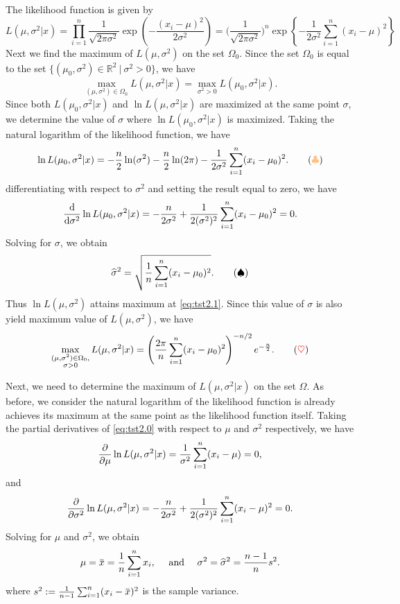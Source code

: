 \begin{solution}
    The likelihood function is given by
    \[
    L(\mu, \sigma^2 | x) = \prod_{i=1}^{n} \frac{1}{\sqrt{2\pi \sigma^2}} \exp\left(-\frac{(x_i - \mu)^2}{2\sigma^2}\right)
    = \bigg(\frac{1}{\sqrt{2\pi \sigma^2}}\bigg)^n \exp\left\{-\frac{1}{2\sigma^2} \sum_{i=1}^{n} (x_i - \mu)^2\right\}
    \]
    Next we find the maximum of $L(\mu, \sigma^2)$ on the set $\Omega_0$. Since the set $\Omega_0$ is equal to the set
    $\{ (\mu_0, \sigma^2) \in \mathbb{R}^2 \> | \> \sigma^2 > 0 \}$, we have 
    \[
        \max_{(\mu, \sigma^2) \in \Omega_0} L(\mu, \sigma^2 | x) = \max_{\sigma^2 > 0} L(\mu_0, \sigma^2 | x).
    \]
    Since both $L(\mu_0, \sigma^2 | x)$ and $\ln L(\mu, \sigma^2 | x)$ are maximized at the same point $\sigma$, we 
    determine the value of $\sigma$ where $\ln L(\mu_0, \sigma^2 | x)$ is maximized. Taking the natural logarithm of the likelihood function, we have
    \[
        \ln L(\mu_0, \sigma^2 | x) = -\frac{n}{2} \ln(\sigma^2) -\frac{n}{2} \ln(2 \pi) - \frac{1}{2\sigma^2} \sum_{i=1}^{n} (x_i - \mu_0)^2. \label{eq:tst2.0} \tag{{\color{orange!50!white} $\clubsuit $}}
    \]
    differentiating with respect to $\sigma^2$ and setting the result equal to zero, we have
    \[
        \odv{}{\sigma^2} \ln L(\mu_0, \sigma^2 | x) = -\frac{n}{2\sigma^2} + \frac{1}{2(\sigma^2)^2} \sum_{i=1}^{n} (x_i - \mu_0)^2 = 0.
    \]
    Solving for $\sigma$, we obtain
    \[
        \widehat{\sigma}^2 = \sqrt{\frac{1}{n} \sum_{i=1}^{n} (x_i - \mu_0)^2}. \label{eq:tst2.1} \tag{{\color{black} $\spadesuit $}}
    \]
    Thus $\ln L(\mu, \sigma^2)$ attains maximum at \eqref{eq:tst2.1}. Since this value of $\sigma$ is also yield maximum value of $L(\mu, \sigma^2)$, we have
    \[
        \max_{\substack{(\mu, \sigma^2) \in \Omega_0,\\ \sigma > 0}} L(\mu, \sigma^2 | x) = \left(\frac{2\pi}{n} \sum^n_{i=1} (x_i - \mu_0)^2 \right)^{-n/2} e^{-\frac{n}{2}}.
        \label{eq:tst2.2} \tag{{\color{red} $\heartsuit$}}
    \]

    Next, we need to determine the maximum of $L(\mu, \sigma^2 | x)$ on the set $\Omega$. As before, 
    we consider the natural logarithm of the likelihood function is already achieves its maximum at the same point as the likelihood function itself. 
    Taking the partial derivatives of \eqref{eq:tst2.0} with respect to $\mu$ and $\sigma^2$ respectively, we have
    \[
        \pdv{}{\mu} \ln L(\mu, \sigma^2 | x) = \frac{1}{\sigma^2} \sum_{i=1}^{n} (x_i - \mu) = 0,
    \]
    and
    \[
        \pdv{}{\sigma^2} \ln L(\mu, \sigma^2 | x) = -\frac{n}{2\sigma^2} + \frac{1}{2(\sigma^2)^2} \sum_{i=1}^{n} (x_i - \mu)^2 = 0.
    \]
    Solving for $\mu$ and $\sigma^2$, we obtain
    \[
        \mu = \ols{x} = \frac{1}{n} \sum_{i=1}^{n} x_i, \quad \text{ and } \quad 
        \sigma^2 = \widehat{\sigma}^2 = \frac{n-1}{n} s^2.
    \]
    where $s^2 := \frac{1}{n-1} \sum_{i=1}^{n} (x_i - \ols{x})^2$ is the sample variance.


\end{solution}
